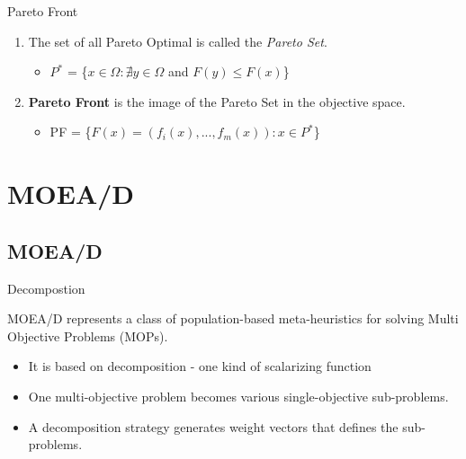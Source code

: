 \documentclass[ignorenonframetext,]{beamer}
\providecommand{\tightlist}{%
  \setlength{\itemsep}{0pt}\setlength{\parskip}{0pt}}
\begin{document}
\begin{frame}{Pareto Front}

\begin{enumerate}
\def\labelenumi{\arabic{enumi}.}
\tightlist
\item
  The set of all Pareto Optimal is called the \emph{Pareto Set}.

  \begin{itemize}
  \tightlist
  \item
    \(P^*\) = \{\(x \in \Omega:\nexists y \in \Omega\) and
    \(F(y) \leq F(x)\)\}
  \end{itemize}
\item
  \textbf{Pareto Front} is the image of the Pareto Set in the objective
  space.

  \begin{itemize}
  \tightlist
  \item
    PF = \{\(F(x) = (f_i(x), ..., f_m(x)): x \in P^*\)\}
  \end{itemize}
\end{enumerate}

\end{frame}

\section{MOEA/D}\label{moead}

\subsection{MOEA/D}\label{moead-1}

\begin{frame}{Decompostion}

MOEA/D represents a class of population-based meta-heuristics for
solving Multi Objective Problems (MOPs).

\begin{itemize}
\tightlist
\item
  It is based on decomposition - one kind of scalarizing function
\item
  One multi-objective problem becomes various single-objective
  sub-problems. 
\item
  A decomposition strategy generates weight vectors that defines the
  sub-problems.
\end{itemize}

\end{frame}
\end{document}
